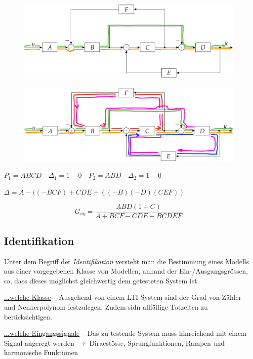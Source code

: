\documentclass[
  10pt,
  a4paper,
]{article}
\numberwithin{equation}{section}
\begin{document}
\begin{multicols}{2}
\begin{figure}[H]
{\centering \includegraphics{images/paste-9.png}

}

\end{figure}

\begin{figure}[H]

{\centering \includegraphics{images/paste-10.png}

}

\end{figure}

\(P_1 = ABCD \quad \Delta_1 = 1-0\quad P_2 = ABD \quad \Delta_2=1-0\)

\(\Delta=A-((-BCF)+CDE+((-B)(-D)(CEF))\)

\[
G_{uy}=\frac{ABD(1+C)}{A+BCF-CDE-BCDEF}
\]

\hypertarget{identifikation}{%
\subsection{Identifikation}\label{identifikation}}

Unter dem Begriff der \emph{Identifikation} versteht man die Bestimmung
eines Modells aus einer vorgegebenen Klasse von Modellen, anhand der
Ein-/Ausgangsgrössen, so, dass dieses möglichst gleichwertig dem
getesteten System ist.

\underline{\footnotesize{...welche Klasse}} -- Ausgehend von einem
LTI-System sind der Grad von Zähler- und Nennerpolynom festzulegen.
Zudem sidn allfällige Totzeiten zu berücksichtigen.

\underline{\footnotesize{...welche Eingangssignale}} -- Das zu testende
System muss hinreichend mit einem Signal angeregt werden \(\rightarrow\)
Diracstösse, Sprungfunktionen, Rampen und harmonische Funktionen


\end{multicols}
\end{document}

